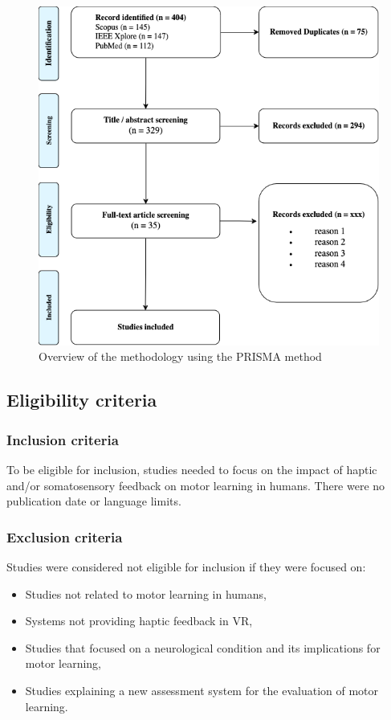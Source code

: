 \documentclass[conference]{IEEEtran}
\begin{document}
\begin{figure}[ht]
    \centering
    \includegraphics[width=\columnwidth]{prisma_overview.png} 
    \caption{Overview of the methodology using the PRISMA method}
    \label{fig:prisma}
\end{figure}

\subsection{Eligibility criteria}
\label{sec:eligibility}
\subsubsection{Inclusion criteria}
To be eligible for inclusion, studies needed to focus on the impact of haptic and/or somatosensory feedback on motor learning in humans. There were no publication date or language limits. 

\subsubsection{Exclusion criteria}
Studies were considered not eligible for inclusion if they were focused on:
\begin{itemize}
    \item Studies not related to motor learning in humans,
    \item Systems not providing haptic feedback in VR,
    \item Studies that focused on a neurological condition and its implications for motor learning,
    \item Studies explaining a new assessment system for the evaluation of motor learning.
\end{itemize}
\end{document}
